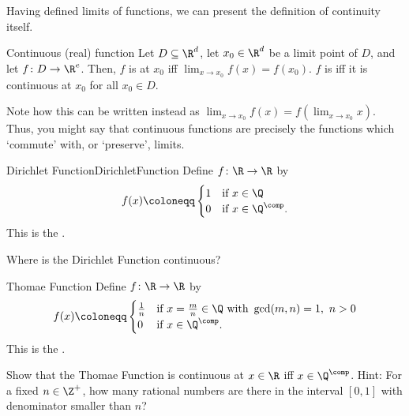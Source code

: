 Having defined limits of functions, we can present the definition of continuity itself.
\begin{dfn}{Continuous (real) function}{}
Let $D\subseteq \R ^d$, let $x_0\in \R ^d$ be a limit point of $D$, and let $f\colon D\rightarrow \R ^e$.  Then, $f$ is  at $x_0$ iff $\lim _{x\to x_0}f(x)=f(x_0)$.  $f$ is  iff it is continuous at $x_0$ for all $x_0\in D$.
\begin{rmk}
Note how this can be written instead as $\lim _{x\to x_0}f(x)=f(\lim _{x\to x_0}x)$.  Thus, you might say that continuous functions are precisely the functions which `commute' with, or `preserve', limits.
\end{rmk}
\end{dfn}
\begin{exm}{Dirichlet Function}{DirichletFunction}
Define $f\colon \R \rightarrow \R$ by
\begin{equation}
f(x)\coloneqq \begin{cases}1 & \text{if }x\in \Q \\ 0 & \text{if }x\in \Q ^{\comp}.\end{cases}
\end{equation}
This is the .
\begin{exr}[breakable=false]{}{}
Where is the Dirichlet Function continuous?
\end{exr}
\end{exm}
\begin{exm}{Thomae Function}{}
Define $f\colon \R \rightarrow \R$ by
\begin{equation*}
f(x)\coloneqq \begin{cases}\tfrac{1}{n} & \text{if }x=\tfrac{m}{n}\in \Q \text{ with }\gcd (m,n)=1,\ n>0 \\ 0 & \text{if }x\in \Q ^{\comp}.\end{cases}
\end{equation*}
This is the .
\begin{exr}[breakable=false]{}{}
Show that the Thomae Function is continuous at $x\in \R$ iff $x\in \Q ^{\comp}$.  Hint:  For a fixed $n\in \Z ^+$, how many rational numbers are there in the interval $[0,1]$ with denominator smaller than $n$?
\end{exr}
\end{exm}
